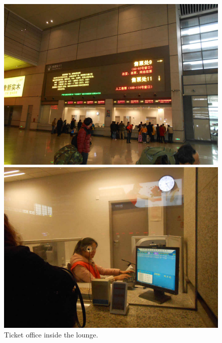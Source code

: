 \documentclass[11pt]{article}
\begin{document}
\begin{figure}[!h]
	\begin{minipage}[t]{.5\textwidth}
     	\centering
        	\includegraphics[scale=0.8]{image038.jpg}
	\end{minipage}%
     \begin{minipage}[t]{.5\textwidth}
         \centering
         \includegraphics[scale=0.8]{image040.jpg} 
    \end{minipage}%
	\caption{Ticket office inside the lounge.\label{pic16}}
 \end{figure}
\end{document}
